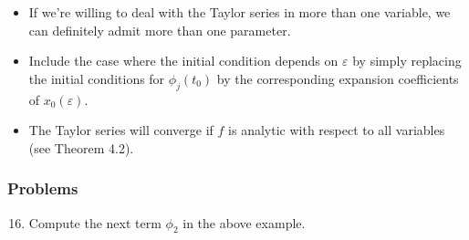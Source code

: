 \documentclass[../notes.tex]{subfiles}
\begin{document}
\begin{itemize}
    \begin{equation*}
        \dot{x} = f(t,x,\varepsilon)
        ,\quad
        x(t_0) = x_0
    \end{equation*}
    guaranteed to exist by Theorem 2.11. Then
    \begin{equation*}
        \phi(t,\varepsilon) = \sum_{j=0}^k\frac{\phi_j(t)}{j!}(\varepsilon-\varepsilon_0)^j+o((\varepsilon-\varepsilon_0)^k)
    \end{equation*}
    where the coefficients can be obtained by recursively solving
    \begin{equation*}
        \dot{\phi}_j = f_j(t,\phi_0,\dots,\phi_j,\varepsilon_0)
        ,\quad
        \phi_j(t_0) =
        \begin{cases}
            x_0 & j = 0\\
            0 & j\geq 1
        \end{cases}
    \end{equation*}
    where the function $f_j$ is recursively defined via
    \begin{equation*}
        f_{j+1}(t,x_0,\dots,x_{j+1},\varepsilon) = {\pdv{f_j}{\varepsilon}}(t,x_0,\dots,x_j,\varepsilon)+\sum_{k=0}^j{\pdv{f_j}{x_k}}(t,x_0,\dots,x_j,\varepsilon)x_{k+1}
        ,\quad
        f_0(t,x_0,\varepsilon) = f(t,x_0,\varepsilon)
    \end{equation*}
    If we assume $f\in C^{k+1}$, the error term will be $O((\varepsilon-\varepsilon_0)^{k+1})$ uniformly for $t\in I$.
    \begin{proof}
        We plug the power series definition of $\phi(t,\varepsilon)$ given above into the differential equation and compare powers of $\varepsilon$.\par
        Estimating the remainder in the Taylor expansion: Since $f\in C^{k+1}$, we know that $\pdv*[k+1]{\phi}{\varepsilon}$ is continuous and hence bounded on $I\times\Lambda_0$, as desired.
    \end{proof}
    \item If we're willing to deal with the Taylor series in more than one variable, we can definitely admit more than one parameter.
    \item Include the case where the initial condition depends on $\varepsilon$ by simply replacing the initial conditions for $\phi_j(t_0)$ by the corresponding expansion coefficients of $x_0(\varepsilon)$.
    \item The Taylor series will converge if $f$ is analytic with respect to all variables (see Theorem 4.2).
\end{itemize}

\subsubsection*{Problems}
\begin{enumerate}[label={\textbf{2.\arabic*.}},ref={2.\arabic*},leftmargin=3.5em]
    \setcounter{enumi}{15}
    \item \label{prb:2.16}Compute the next term $\phi_2$ in the above example.
\end{enumerate}
\end{document}
